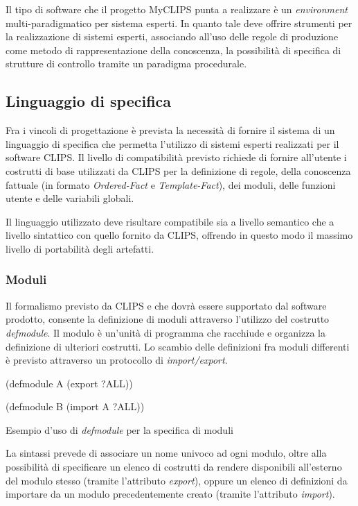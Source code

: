 Il tipo di software che il progetto MyCLIPS punta a realizzare è un \emph{environment} multi-paradigmatico per sistema esperti. In quanto tale deve offrire strumenti per la realizzazione di sistemi esperti, associando all'uso delle regole di produzione come metodo di rappresentazione della conoscenza, la possibilità di specifica di strutture di controllo tramite un paradigma procedurale.

\subsection{Linguaggio di specifica}\label{par:linguaggio}
Fra i vincoli di progettazione è prevista la necessità di fornire il sistema di un linguaggio di specifica che permetta l'utilizzo di sistemi esperti realizzati per il software CLIPS. Il livello di compatibilità previsto richiede di fornire all'utente i costrutti di base utilizzati da CLIPS per la definizione di regole, della conoscenza fattuale (in formato \emph{Ordered-Fact} e \emph{Template-Fact}), dei moduli, delle funzioni utente e delle variabili globali.

Il linguaggio utilizzato deve risultare compatibile sia a livello semantico che a livello sintattico con quello fornito da CLIPS, offrendo in questo modo il massimo livello di portabilità degli artefatti.

\subsubsection{Moduli}\label{par:linguaggio-moduli}
Il formalismo previsto da CLIPS e che dovrà essere supportato dal software prodotto, consente la definizione di moduli attraverso l'utilizzo del costrutto \emph{defmodule}.
Il modulo è un'unità di programma che racchiude e organizza la definizione di ulteriori costrutti. Lo scambio delle definizioni fra moduli differenti è previsto attraverso un protocollo di \emph{import/export}.

\begin{program}
\begin{verbatimtab}

(defmodule A
	(export ?ALL))

(defmodule B
	(import A ?ALL))
\end{verbatimtab}
\caption{Esempio d'uso di \emph{defmodule} per la specifica di moduli}
\end{program}

La sintassi prevede di associare un nome univoco ad ogni modulo, oltre alla possibilità di specificare un elenco di costrutti da rendere disponibili all'esterno del modulo stesso (tramite l'attributo \emph{export}), oppure un elenco di definizioni da importare da un modulo precedentemente creato (tramite l'attributo \emph{import}).


